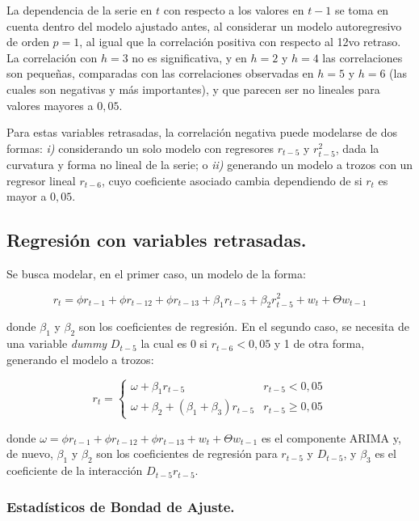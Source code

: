 \documentclass[]{article}
\begin{document}
La dependencia de la serie en \(t\) con respecto a los valores en \(t-1\) se toma en cuenta dentro del modelo ajustado antes, al considerar un modelo autoregresivo de orden \(p=1\), al igual que la correlación positiva con respecto al 12vo retraso.
La correlación con \(h=3\) no es significativa, y en \(h=2\) y \(h=4\) las correlaciones son pequeñas, comparadas con las correlaciones observadas en \(h=5\) y \(h=6\) (las cuales son negativas y más importantes), y que parecen ser no lineales para valores mayores a \(0{,}05\).

Para estas variables retrasadas, la correlación negativa puede modelarse de dos formas: \emph{i)} considerando un solo modelo con regresores \(r_{t-5}\) y \(r_{t-5}^2\), dada la curvatura y forma no lineal de la serie; o \emph{ii)} generando un modelo a trozos con un regresor lineal \(r_{t-6}\), cuyo coeficiente asociado cambia dependiendo de si \(r_t\) es mayor a \(0{,}05\).

\hypertarget{regresiuxf3n-con-variables-retrasadas.}{%
\subsection{Regresión con variables retrasadas.}\label{regresiuxf3n-con-variables-retrasadas.}}

Se busca modelar, en el primer caso, un modelo de la forma:

\[
r_t = \phi r_{t-1} + \phi r_{t-12} + \phi r_{t-13} + \beta_1 r_{t-5} + \beta_2 r_{t-5}^2 + w_t + \Theta w_{t-1}\label{eq:model-reg}
\]

donde \(\beta_1\) y \(\beta_2\) son los coeficientes de regresión. En el segundo caso, se necesita de una variable \emph{dummy} \(D_{t-5}\) la cual es 0 si \(r_{t-6} < 0{,}05\) y 1 de otra forma, generando el modelo a trozos:

\[
r_t = \begin{cases}
  \omega + \beta_1 r_{t-5} &  r_{t-5} < 0{,}05 \\
  \omega + \beta_2 + (\beta_1 + \beta_3) r_{t-5} & r_{t-5} \ge 0{,}05
\end{cases}\label{eq:model-reg-trozos}
\]

donde \(\omega = \phi r_{t-1} + \phi r_{t-12} + \phi r_{t-13} + w_t + \Theta w_{t-1}\) es el componente ARIMA y, de nuevo, \(\beta_1\) y \(\beta_2\) son los coeficientes de regresión para \(r_{t-5}\) y \(D_{t-5}\), y \(\beta_3\) es el coeficiente de la interacción \(D_{t-5}r_{t-5}\).

\hypertarget{estaduxedsticos-de-bondad-de-ajuste.-1}{%
\subsubsection{Estadísticos de Bondad de Ajuste.}\label{estaduxedsticos-de-bondad-de-ajuste.-1}}
\end{document}
